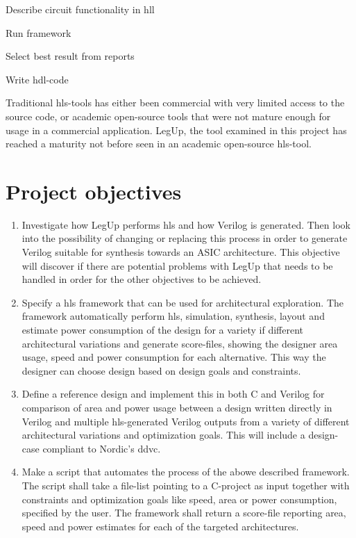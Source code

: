 \begin{compactenum}
    \item Describe circuit functionality in \gls{hll}
    \item Run framework
    \item Select best result from reports
    \item Write \gls{hdl}-code
\end{compactenum}
Traditional \gls{hls}-tools has either been commercial with very limited access to the source code, or academic open-source tools that were not mature enough for usage in a commercial application. LegUp, the tool examined in this project has reached a maturity not before seen in an academic open-source \gls{hls}-tool.
\section{Project objectives}
\begin{enumerate}
    \item Investigate how LegUp performs \gls{hls} and how Verilog is generated. Then look into the possibility of changing or replacing this process in order to generate Verilog suitable for synthesis towards an ASIC architecture. This objective will discover if there are potential problems with LegUp that needs to be handled in order for the other objectives to be achieved.
    \item Specify a \gls{hls} framework that can be used for architectural exploration. The framework  automatically perform \gls{hls}, simulation, synthesis, layout and estimate power consumption of the design for a variety if different architectural variations and generate score-files, showing the designer area usage, speed and power consumption for each alternative. This way the designer can choose design based on design goals and constraints.
    \item Define a reference design and implement this in both C and Verilog for comparison of area and power usage between a design written directly in Verilog and multiple \gls{hls}-generated Verilog outputs from a variety of different architectural variations and optimization goals. This will include a design-case compliant to Nordic’s \gls{ddvc}.
    \item Make a script that automates the process of the abowe described framework. The script shall take a file-list pointing to a C-project as input together with constraints and optimization goals like speed, area or power consumption, specified by the user. The framework shall return a score-file reporting area, speed and power estimates for each of the targeted architectures.
\end{enumerate}